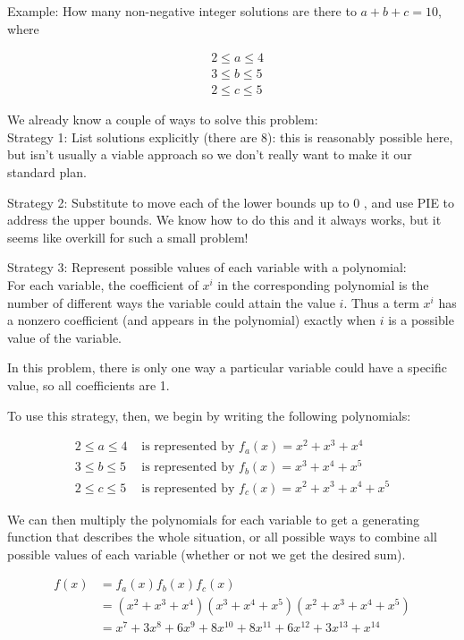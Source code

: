 \documentclass{article}
\begin{document}
Example: How many non-negative integer solutions are there to $a+b+c=10$, where

$$
\begin{aligned}
& 2 \leq a \leq 4 \\
& 3 \leq b \leq 5 \\
& 2 \leq c \leq 5
\end{aligned}
$$

We already know a couple of ways to solve this problem:\\
Strategy 1: List solutions explicitly (there are 8): this is reasonably possible here, but isn't usually a viable approach so we don't really want to make it our standard plan.

Strategy 2: Substitute to move each of the lower bounds up to 0 , and use PIE to address the upper bounds. We know how to do this and it always works, but it seems like overkill for such a small problem!

Strategy 3: Represent possible values of each variable with a polynomial:\\
For each variable, the coefficient of $x^{i}$ in the corresponding polynomial is the number of different ways the variable could attain the value $i$. Thus a term $x^{i}$ has a nonzero coefficient (and appears in the polynomial) exactly when $i$ is a possible value of the variable.

In this problem, there is only one way a particular variable could have a specific value, so all coefficients are 1.

To use this strategy, then, we begin by writing the following polynomials:

$$
\begin{array}{ll}
2 \leq a \leq 4 & \text { is represented by } f_{a}(x)=x^{2}+x^{3}+x^{4} \\
3 \leq b \leq 5 & \text { is represented by } f_{b}(x)=x^{3}+x^{4}+x^{5} \\
2 \leq c \leq 5 & \text { is represented by } f_{c}(x)=x^{2}+x^{3}+x^{4}+x^{5}
\end{array}
$$

We can then multiply the polynomials for each variable to get a generating function that describes the whole situation, or all possible ways to combine all possible values of each variable (whether or not we get the desired sum).

$$
\begin{aligned}
f(x) & =f_{a}(x) f_{b}(x) f_{c}(x) \\
& =\left(x^{2}+x^{3}+x^{4}\right)\left(x^{3}+x^{4}+x^{5}\right)\left(x^{2}+x^{3}+x^{4}+x^{5}\right) \\
& =x^{7}+3 x^{8}+6 x^{9}+8 x^{10}+8 x^{11}+6 x^{12}+3 x^{13}+x^{14}
\end{aligned}
$$
\end{document}
